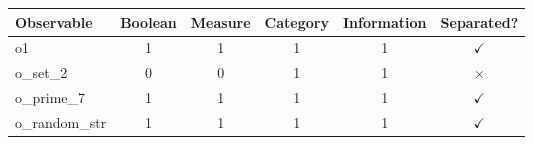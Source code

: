 \begin{tabular}{l c c c c c}
\toprule
\textbf{Observable} & \textbf{Boolean} & \textbf{Measure} & \textbf{Category} & \textbf{Information} & \textbf{Separated?} \\\midrule
  o1 & 1 & 1 & 1 & 1 & $\checkmark$ \\
  o\_set\_2 & 0 & 0 & 1 & 1 & $\times$ \\
  o\_prime\_7 & 1 & 1 & 1 & 1 & $\checkmark$ \\
  o\_random\_str & 1 & 1 & 1 & 1 & $\checkmark$ \\
\bottomrule
\end{tabular}
